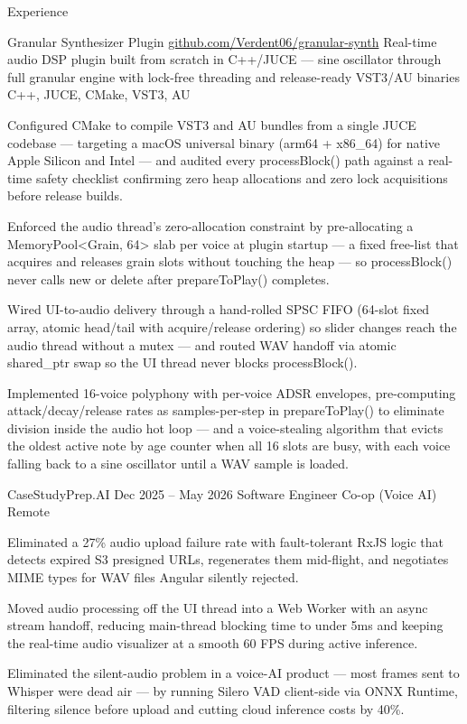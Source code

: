 \documentclass[
	11pt
]{../../../template}
\begin{document}
	\begin{rSection}{E}{xperience}
		\begin{rSectionEntry}
			{Granular Synthesizer Plugin}
			{\href{https://github.com/Verdent06/granular-synth}{github.com/Verdent06/granular-synth}}
			{Real-time audio DSP plugin built from scratch in C++/JUCE --- sine oscillator through full granular engine with lock-free threading and release-ready VST3/AU binaries}
			{C++, JUCE, CMake, VST3, AU}
			{}

			\item Configured CMake to compile VST3 and AU bundles from a single JUCE codebase --- targeting a macOS universal binary (arm64 + x86\_64) for native Apple Silicon and Intel --- and audited every processBlock() path against a real-time safety checklist confirming zero heap allocations and zero lock acquisitions before release builds.
			\item Enforced the audio thread's zero-allocation constraint by pre-allocating a MemoryPool\textless{}Grain, 64\textgreater{} slab per voice at plugin startup --- a fixed free-list that acquires and releases grain slots without touching the heap --- so processBlock() never calls new or delete after prepareToPlay() completes.
			\item Wired UI-to-audio delivery through a hand-rolled SPSC FIFO (64-slot fixed array, atomic head/tail with acquire/release ordering) so slider changes reach the audio thread without a mutex --- and routed WAV handoff via atomic shared\_ptr swap so the UI thread never blocks processBlock().
			\item Implemented 16-voice polyphony with per-voice ADSR envelopes, pre-computing attack/decay/release rates as samples-per-step in prepareToPlay() to eliminate division inside the audio hot loop --- and a voice-stealing algorithm that evicts the oldest active note by age counter when all 16 slots are busy, with each voice falling back to a sine oscillator until a WAV sample is loaded.
		\end{rSectionEntry}

		\begin{rSectionEntry}
			{CaseStudyPrep.AI}
			{Dec 2025 -- May 2026}
			{Software Engineer Co-op (Voice AI)}
			{}
			{Remote}

			\item Eliminated a 27\% audio upload failure rate with fault-tolerant RxJS logic that detects expired S3 presigned URLs, regenerates them mid-flight, and negotiates MIME types for WAV files Angular silently rejected.
			\item Moved audio processing off the UI thread into a Web Worker with an async stream handoff, reducing main-thread blocking time to under 5ms and keeping the real-time audio visualizer at a smooth 60 FPS during active inference.
			\item Eliminated the silent-audio problem in a voice-AI product --- most frames sent to Whisper were dead air --- by running Silero VAD client-side via ONNX Runtime, filtering silence before upload and cutting cloud inference costs by 40\%.
		\end{rSectionEntry}


\end{rSection}
\end{document}
